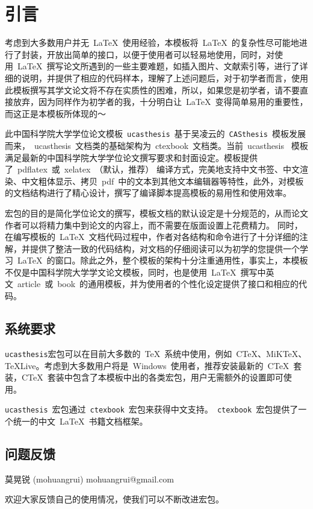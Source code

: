 
\chapter{引言}
\label{chap:introduction}

考虑到大多数用户并无~\LaTeX{}~使用经验，本模板将~\LaTeX{}~的复杂性尽可能地进行了封装，开放出简单的接口，以便于使用者可以轻易地使用，同时，对使用~\LaTeX{}~撰写论文所遇到的一些主要难题，如插入图片、文献索引等，进行了详细的说明，并提供了相应的代码样本，理解了上述问题后，对于初学者而言，使用此模板撰写其学文论文将不存在实质性的困难，所以，如果您是初学者，请不要直接放弃，因为同样作为初学者的我，十分明白让~\LaTeX{}~变得简单易用的重要性，而这正是本模板所体现的～

此中国科学院大学学位论文模板~\texttt{ucasthesis}~基于吴凌云的~\texttt{CASthesis}~模板发展而来，~ucasthesis~文档类的基础架构为~ctexbook~文档类。当前~ucasthesis~ 模板满足最新的中国科学院大学学位论文撰写要求和封面设定。模板提供了~pdflatex~或~xelatex~（默认，推荐） 编译方式，完美地支持中文书签、中文渲染、中文粗体显示、拷贝~pdf~中的文本到其他文本编辑器等特性，此外，对模板的文档结构进行了精心设计，撰写了编译脚本提高模板的易用性和使用效率。

宏包的目的是简化学位论文的撰写，模板文档的默认设定是十分规范的，从而论文作者可以将精力集中到论文的内容上，而不需要在版面设置上花费精力。 同时，在编写模板的~\LaTeX{}~文档代码过程中，作者对各结构和命令进行了十分详细的注解，并提供了整洁一致的代码结构，对文档的仔细阅读可以为初学的您提供一个学习~\LaTeX{}~的窗口。除此之外，整个模板的架构十分注重通用性，事实上，本模板不仅是中国科学院大学学文论文模板，同时，也是使用~\LaTeX{}~撰写中英文~article~或~book~的通用模板，并为使用者的个性化设定提供了接口和相应的代码。

\section{系统要求}

\texttt{ucasthesis}宏包可以在目前大多数的~\TeX{}~系统中使用，例如~C\TeX{}、MiK\TeX{}、\TeX{}Live。考虑到大多数用户将是~Windows~使用者，推荐安装最新的~C\TeX{}~套装，C\TeX{}~套装中包含了本模板中出的各类宏包，用户无需额外的设置即可使用。

\texttt{ucasthesis}~宏包通过~\texttt{ctexbook}~宏包来获得中文支持。~\texttt{ctexbook}~宏包提供了一个统一的中文~\LaTeX{}~书籍文档框架。

\section{问题反馈}

\begin{center}
莫晃锐 (mohuangrui) \quad mohuangrui@gmail.com
\end{center}

欢迎大家反馈自己的使用情况，使我们可以不断改进宏包。
